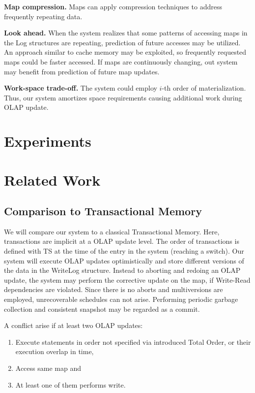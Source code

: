 \documentclass{sig-semester}
\def\OLAP{OLAP\xspace}
\begin{document}
\textbf{Map compression.} Maps can apply compression techniques to address frequently repeating data.

\textbf{Look ahead.} When the system realizes that some patterns of accessing maps in the Log structures are repeating, prediction of future accesses may be utilized. An approach similar to cache memory may be exploited, so frequently requested maps could be faster accessed. If maps are continuously changing, out system may benefit from prediction of future map updates.

\textbf{Work-space trade-off. } The system could employ $i$-th order of materialization. Thus, our system amortizes space requirements causing additional work during \OLAP update.

\newpage
\section{Experiments}
\label{sec:Experiments}
\vspace{2mm}

\section{Related Work}
\label{sec:Related}
\vspace{2mm}

\subsection{Comparison to Transactional Memory}
We will compare our system to a classical Transactional Memory. Here, transactions are implicit at a \OLAP update level. The order of transactions is defined with TS at the time of the entry in the system (reaching a switch). Our system will execute \OLAP updates optimistically and store different versions of the data in the WriteLog structure. Instead to aborting and redoing an \OLAP update, the system may perform the corrective update on the map, if Write-Read dependencies are violated. Since there is no aborts and multiversions are employed, unrecoverable schedules can not arise. Performing periodic garbage collection and consistent snapshot may be regarded as a commit.

A conflict arise if at least two \OLAP updates:
\begin{enumerate}[(1)]
 \item Execute statements in order not specified via introduced Total Order, or their execution overlap in time, 
 \item Access same map and
 \item At least one of them performs write.
\end{enumerate}
\end{document}
